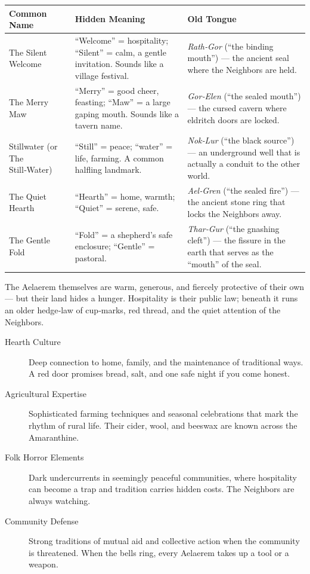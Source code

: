 \begin{center}
\begin{tabular}{|p{3cm}|p{5cm}|p{5cm}|}
\hline
\textbf{Common Name} & \textbf{Hidden Meaning} & \textbf{Old Tongue} \\
\midrule
The Silent Welcome & “Welcome” = hospitality; “Silent” = calm, a gentle invitation. Sounds like a village festival. & \emph{Rath‑Gor} (“the binding mouth”) — the ancient seal where the Neighbors are held. \\
The Merry Maw & “Merry” = good cheer, feasting; “Maw” = a large gaping mouth. Sounds like a tavern name. & \emph{Gor‑Elen} (“the sealed mouth”) — the cursed cavern where eldritch doors are locked. \\
Stillwater (or The Still‑Water) & “Still” = peace; “water” = life, farming. A common halfling landmark. & \emph{Nok‑Lur} (“the black source”) — an underground well that is actually a conduit to the other world. \\
The Quiet Hearth & “Hearth” = home, warmth; “Quiet” = serene, safe. & \emph{Ael‑Gren} (“the sealed fire”) — the ancient stone ring that locks the Neighbors away. \\
The Gentle Fold & “Fold” = a shepherd’s safe enclosure; “Gentle” = pastoral. & \emph{Thar‑Gur} (“the gnashing cleft”) — the fissure in the earth that serves as the “mouth” of the seal. \\
\hline
\end{tabular}
\end{center}

\noindent The Aelaerem themselves are warm, generous, and fiercely protective of their own — but their land hides a hunger. Hospitality is their public law; beneath it runs an older hedge‑law of cup‑marks, red thread, and the quiet attention of the Neighbors.

\begin{description}
\item[Hearth Culture] Deep connection to home, family, and the maintenance of traditional ways. A red door promises bread, salt, and one safe night if you come honest.
\item[Agricultural Expertise] Sophisticated farming techniques and seasonal celebrations that mark the rhythm of rural life. Their cider, wool, and beeswax are known across the Amaranthine.
\item[Folk Horror Elements] Dark undercurrents in seemingly peaceful communities, where hospitality can become a trap and tradition carries hidden costs. The Neighbors are always watching.
\item[Community Defense] Strong traditions of mutual aid and collective action when the community is threatened. When the bells ring, every Aelaerem takes up a tool or a weapon.
\end{description}

